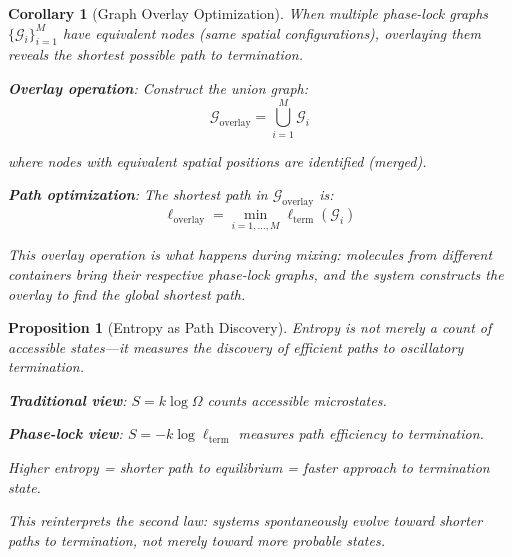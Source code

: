 \documentclass[12pt,a4paper]{article}
\newtheorem{corollary}[theorem]{Corollary}
\newtheorem{proposition}[theorem]{Proposition}
\theoremstyle{remark}
\begin{document}
\begin{corollary}[Graph Overlay Optimization]
\label{cor:graph_overlay}
When multiple phase-lock graphs $\{\mathcal{G}_i\}_{i=1}^{M}$ have equivalent nodes (same spatial configurations), overlaying them reveals the shortest possible path to termination.

\textbf{Overlay operation}: Construct the union graph:
\begin{equation}
\mathcal{G}_{\text{overlay}} = \bigcup_{i=1}^{M} \mathcal{G}_i
\end{equation}

where nodes with equivalent spatial positions are identified (merged).

\textbf{Path optimization}: The shortest path in $\mathcal{G}_{\text{overlay}}$ is:
\begin{equation}
\ell_{\text{overlay}} = \min_{i=1,\ldots,M} \ell_{\text{term}}(\mathcal{G}_i)
\end{equation}

This overlay operation is what happens during mixing: molecules from different containers bring their respective phase-lock graphs, and the system constructs the overlay to find the global shortest path.
\end{corollary}

\begin{proposition}[Entropy as Path Discovery]
Entropy is not merely a count of accessible states—it measures the discovery of efficient paths to oscillatory termination.

\textbf{Traditional view}: $S = k \log \Omega$ counts accessible microstates.

\textbf{Phase-lock view}: $S = -k \log \ell_{\text{term}}$ measures path efficiency to termination.

Higher entropy = shorter path to equilibrium = faster approach to termination state.

This reinterprets the second law: systems spontaneously evolve toward shorter paths to termination, not merely toward more probable states.
\end{proposition}
\end{document}

